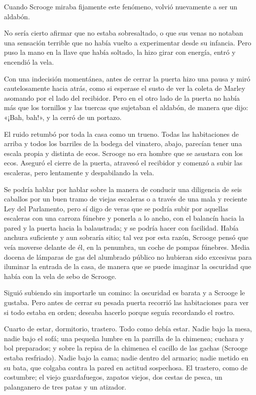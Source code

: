 \documentclass{novela}
\begin{document}
 Cuando Scrooge miraba fijamente este fenómeno, volvió nuevamente a ser un aldabón.

 No sería cierto afirmar que no estaba sobresaltado, o que sus venas no notaban una sensación terrible que no había vuelto a experimentar desde su infancia. Pero puso la mano en la llave que había soltado, la hizo girar con energía, entró y encendió la vela.

 Con una indecisión momentánea, antes de cerrar la puerta hizo una pausa y miró cautelosamente hacia atrás, como si esperase el susto de ver la coleta de Marley asomando por el lado del recibidor. Pero en el otro lado de la puerta no había más que los tornillos y las tuercas que sujetaban el aldabón, de manera que dijo: «¡Bah, bah!», y la cerró de un portazo.

 El ruido retumbó por toda la casa como un trueno. Todas las habitaciones de arriba y todos los barriles de la bodega del vinatero, abajo, parecían tener una escala propia y distinta de ecos. Scrooge no era hombre que se asustara con los ecos. Aseguró el cierre de la puerta, atravesó el recibidor y comenzó a subir las escaleras, pero lentamente y despabilando la vela.

 Se podría hablar por hablar sobre la manera de conducir una diligencia de seis caballos por un buen tramo de viejas escaleras o a través de una mala y reciente Ley del Parlamento, pero sí digo de veras que se podría subir por aquellas escaleras con una carroza fúnebre y ponerla a lo ancho, con el balancín hacia la pared y la puerta hacia la balaustrada; y se podría hacer con facilidad. Había anchura suficiente y aun sobraría sitio; tal vez por esta razón, Scrooge pensó que veía moverse delante de él, en la penumbra, un coche de pompas fúnebres. Media docena de lámparas de gas del alumbrado público no hubieran sido excesivas para iluminar la entrada de la casa, de manera que se puede imaginar la oscuridad que había con la vela de sebo de Scrooge.

 Siguió subiendo sin importarle un comino: la oscuridad es barata y a Scrooge le gustaba. Pero antes de cerrar su pesada puerta recorrió las habitaciones para ver si todo estaba en orden; deseaba hacerlo porque seguía recordando el rostro.

 Cuarto de estar, dormitorio, trastero. Todo como debía estar. Nadie bajo la mesa, nadie bajo el sofá; una pequeña lumbre en la parrilla de la chimenea; cuchara y bol preparados; y sobre la repisa de la chimenea el cacillo de las gachas (Scrooge estaba resfriado). Nadie bajo la cama; nadie dentro del armario; nadie metido en su bata, que colgaba contra la pared en actitud sospechosa. El trastero, como de costumbre; el viejo guardafuegos, zapatos viejos, dos cestas de pesca, un palanganero de tres patas y un atizador.
\end{document}
